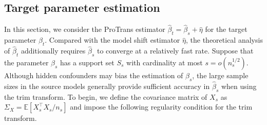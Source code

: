 \documentclass[12pt]{article}
\newtheorem{assump}{Assumption}
\begin{document}
\subsection{Target parameter estimation}\label{theory:target}
In this section, we consider the ProTrans estimator $\hat{\beta}_t = \hat{\beta}_s + \hat{\eta}$ for the target parameter $\beta_t$. Compared with the model shift estimator $\hat{\eta}$, the theoretical analysis of $\hat{\beta}_t$ additionally requires $\hat{\beta}_s$ to converge at a relatively fast rate. Suppose that the parameter $\beta_s$ has a support set $S_s$ with cardinality at most $s=o(n_s^{1/2})$. Although hidden confounders may bias the estimation of $\beta_s$, the large sample sizes in the source models generally provide sufficient accuracy in $\hat{\beta}_s$ when using the trim transform. To begin, we define the covariance matrix of $X_s$ as $\Sigma_X = \mathbb{E}[X_s^\top X_s/n_s]$ and impose the following regularity condition for the trim transform. 
\end{document}
